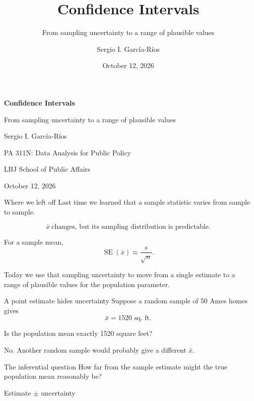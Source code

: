 \documentclass[11pt,aspectratio=169]{beamer}
\author{Sergio I. Garc\'ia-R\'ios}
\title{Confidence Intervals}
\subtitle{From sampling uncertainty to a range of plausible values}
\institute{PA 311N: Data Analysis for Public Policy\\LBJ School of Public Affairs}
\date{October 12, 2026}
\newcommand{\SE}{\operatorname{SE}}
\begin{document}
\begin{frame}[plain]
\centering
\vspace{0.6cm}
{\color{LBJnavy}\LARGE\bfseries Confidence Intervals\par}
\vspace{0.4cm}
{\large From sampling uncertainty to a range of plausible values\par}
\vspace{0.9cm}
{\normalsize Sergio I. Garc\'ia-R\'ios\par}
\vspace{0.2cm}
{\small PA 311N: Data Analysis for Public Policy\par}
{\small LBJ School of Public Affairs\par}
\vfill
{\small October 12, 2026\par}
\end{frame}

\begin{frame}{Where we left off}
Last time we learned that a sample statistic varies from sample to sample.

\[
\bar{x}\ \text{changes, but its sampling distribution is predictable.}
\]

For a sample mean,
\[
\SE(\bar{x}) \approx \frac{s}{\sqrt{n}}.
\]

\vspace{0.8em}
Today we use that sampling uncertainty to move from a \alert{single estimate} to a \alert{range of plausible values} for the population parameter.
\end{frame}

\begin{frame}{A point estimate hides uncertainty}
Suppose a random sample of 50 Ames homes gives
\[
\bar{x}=1520\text{ sq. ft.}
\]

Is the population mean exactly 1520 square feet?

\vspace{0.8em}
No. Another random sample would probably give a different $\bar{x}$.

\vfill
\begin{alertblock}{The inferential question}
How far from the sample estimate might the true population mean reasonably be?
\end{alertblock}
\end{frame}

\begin{frame}[standout]
\Large Estimate $\pm$ uncertainty
\end{frame}
\end{document}
